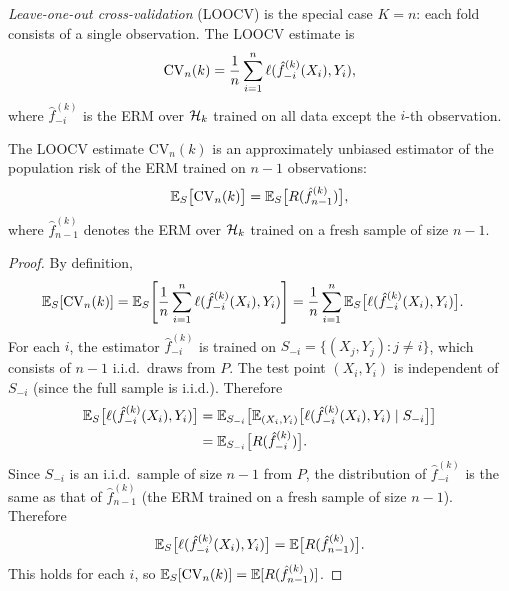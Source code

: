 \documentclass[11pt,a4paper]{article}
\begin{document}
\begin{definition}
\label{def:loocv}
\emph{Leave-one-out cross-validation} (LOOCV) is the special case
$K = n$: each fold consists of a single observation.  The LOOCV
estimate is
\[
    \mathrm{CV}_n(k) = \frac{1}{n}\sum_{i=1}^n
    \ell(\hat{f}_{-i}^{(k)}(X_i), Y_i),
\]
where $\hat{f}_{-i}^{(k)}$ is the ERM over $\mathcal{H}_k$ trained on
all data except the $i$-th observation.
\end{definition}

\begin{theorem}
\label{thm:loocv_unbiased}
The LOOCV estimate $\mathrm{CV}_n(k)$ is an approximately unbiased
estimator of the population risk of the ERM trained on $n - 1$
observations:
\[
    \mathbb{E}_S\bigl[\mathrm{CV}_n(k)\bigr]
    = \mathbb{E}_S\bigl[R(\hat{f}_{n-1}^{(k)})\bigr],
\]
where $\hat{f}_{n-1}^{(k)}$ denotes the ERM over $\mathcal{H}_k$
trained on a fresh sample of size $n - 1$.
\end{theorem}

\begin{proof}
By definition,
\begin{align*}
    \mathbb{E}_S[\mathrm{CV}_n(k)]
    &= \mathbb{E}_S\!\left[\frac{1}{n}\sum_{i=1}^n
    \ell(\hat{f}_{-i}^{(k)}(X_i), Y_i)\right]
    = \frac{1}{n}\sum_{i=1}^n
    \mathbb{E}_S\bigl[\ell(\hat{f}_{-i}^{(k)}(X_i), Y_i)\bigr].
\end{align*}
For each $i$, the estimator $\hat{f}_{-i}^{(k)}$ is trained on
$S_{-i} = \{(X_j, Y_j) : j \neq i\}$, which consists of $n - 1$
i.i.d.\ draws from $P$.  The test point $(X_i, Y_i)$ is independent
of $S_{-i}$ (since the full sample is i.i.d.).  Therefore
\begin{align*}
    \mathbb{E}_S\bigl[\ell(\hat{f}_{-i}^{(k)}(X_i), Y_i)\bigr]
    &= \mathbb{E}_{S_{-i}}\bigl[\mathbb{E}_{(X_i, Y_i)}\bigl[
    \ell(\hat{f}_{-i}^{(k)}(X_i), Y_i) \mid S_{-i}\bigr]\bigr] \\
    &= \mathbb{E}_{S_{-i}}\bigl[R(\hat{f}_{-i}^{(k)})\bigr].
\end{align*}
Since $S_{-i}$ is an i.i.d.\ sample of size $n - 1$ from $P$, the
distribution of $\hat{f}_{-i}^{(k)}$ is the same as that of
$\hat{f}_{n-1}^{(k)}$ (the ERM trained on a fresh sample of size
$n - 1$).  Therefore
\[
    \mathbb{E}_S\bigl[\ell(\hat{f}_{-i}^{(k)}(X_i), Y_i)\bigr]
    = \mathbb{E}\bigl[R(\hat{f}_{n-1}^{(k)})\bigr].
\]
This holds for each $i$, so
$\mathbb{E}_S[\mathrm{CV}_n(k)] = \mathbb{E}[R(\hat{f}_{n-1}^{(k)})]$.
\end{proof}
\end{document}
